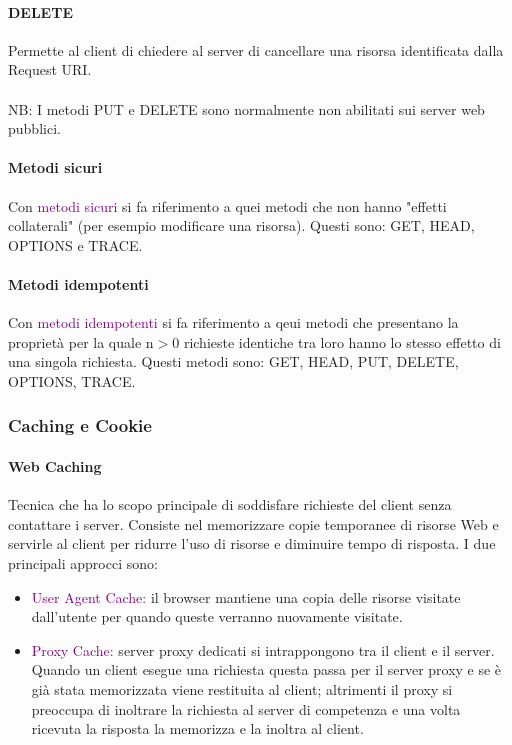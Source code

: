 \paragraph{DELETE} Permette al client di chiedere al server di cancellare una risorsa identificata dalla Request URI.
\\ \\ NB: I metodi PUT e DELETE sono normalmente non abilitati sui server web pubblici.

\paragraph{Metodi sicuri} Con \textcolor{purple}{metodi sicuri} si fa riferimento a quei metodi che non hanno "effetti collaterali" (per esempio modificare una risorsa). Questi sono: GET, HEAD, OPTIONS e TRACE.

\paragraph{Metodi idempotenti} Con \textcolor{purple}{metodi idempotenti} si fa riferimento a qeui metodi che presentano la proprietà per la quale n$>$0 richieste identiche tra loro hanno lo stesso effetto di una singola richiesta. Questi metodi sono: GET, HEAD, PUT, DELETE, OPTIONS, TRACE.

\subsubsection{Caching e Cookie}
\paragraph{Web Caching} Tecnica che ha lo scopo principale di soddisfare richieste del client senza contattare i server. Consiste nel memorizzare copie temporanee di risorse Web e servirle al client per ridurre l’uso di risorse e diminuire tempo di risposta. I due principali approcci sono:
\begin{itemize}
    \item \textcolor{purple}{User Agent Cache:} il browser mantiene una copia delle risorse visitate dall'utente per quando queste verranno nuovamente visitate.
    \item \textcolor{purple}{Proxy Cache:} server proxy dedicati si intrappongono tra il client e il server. Quando un client esegue una richiesta questa passa per il server proxy e se è già stata memorizzata viene restituita al client; altrimenti il proxy si preoccupa di inoltrare la richiesta al server di competenza e una volta ricevuta la risposta la memorizza e la inoltra al client.
\end{itemize}

